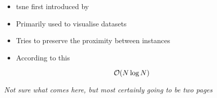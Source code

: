 \begin{itemize}
	\item \gls{tsne} first introduced by \cite{van2008visualizing}
	\item Primarily used to visualise datasets
	\item Tries to preserve the proximity between instances \cite{HandsOnMLCh8}
	\item According to this \cite{van2014accelerating}
\end{itemize}

$$\mathcal{O}(N \log N)$$

\clearpage

\begin{center}
	\textit{Not sure what comes here, but most certainly going to be two pages}
\end{center}
